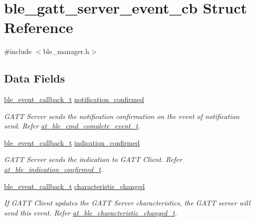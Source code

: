 \hypertarget{structble__gatt__server__event__cb}{}\section{ble\+\_\+gatt\+\_\+server\+\_\+event\+\_\+cb Struct Reference}
\label{structble__gatt__server__event__cb}


{\ttfamily \#include $<$ble\+\_\+manager.\+h$>$}

\subsection*{Data Fields}
\begin{DoxyCompactItemize}
\item 
\mbox{\hyperlink{ble__manager_8h_a04ce4bb8cb8282f2762e3924b1773cc9}{ble\+\_\+event\+\_\+callback\+\_\+t}} \mbox{\hyperlink{structble__gatt__server__event__cb_aba03ebc64859db1ac8bf0882dc6acac2}{notification\+\_\+confirmed}}
\begin{DoxyCompactList}\small\item\em G\+A\+TT Server sends the notification confirmation on the event of notification send. Refer \mbox{\hyperlink{structat__ble__cmd__complete__event__t}{at\+\_\+ble\+\_\+cmd\+\_\+complete\+\_\+event\+\_\+t}}. \end{DoxyCompactList}\item 
\mbox{\hyperlink{ble__manager_8h_a04ce4bb8cb8282f2762e3924b1773cc9}{ble\+\_\+event\+\_\+callback\+\_\+t}} \mbox{\hyperlink{structble__gatt__server__event__cb_a5310926130d77c5c1b550880f4ae2172}{indication\+\_\+confirmed}}
\begin{DoxyCompactList}\small\item\em G\+A\+TT Server sends the indication to G\+A\+TT Client. Refer \mbox{\hyperlink{structat__ble__indication__confirmed__t}{at\+\_\+ble\+\_\+indication\+\_\+confirmed\+\_\+t}}. \end{DoxyCompactList}\item 
\mbox{\hyperlink{ble__manager_8h_a04ce4bb8cb8282f2762e3924b1773cc9}{ble\+\_\+event\+\_\+callback\+\_\+t}} \mbox{\hyperlink{structble__gatt__server__event__cb_a3180cecaaa199e1dd5aecb41f552b4bc}{characteristic\+\_\+changed}}
\begin{DoxyCompactList}\small\item\em If G\+A\+TT Client updates the G\+A\+TT Server characteristics, the G\+A\+TT server will send this event. Refer \mbox{\hyperlink{structat__ble__characteristic__changed__t}{at\+\_\+ble\+\_\+characteristic\+\_\+changed\+\_\+t}}. \end{DoxyCompactList}\item 

\end{DoxyCompactItemize}
